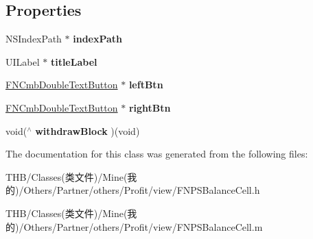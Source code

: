 \subsection*{Properties}
\begin{DoxyCompactItemize}
\item 
\mbox{\label{interface_f_n_p_s_balance_cell_aff16682d0b59c8b62ca5bdc0540b9d07}} 
N\+S\+Index\+Path $\ast$ {\bfseries index\+Path}
\item 
\mbox{\label{interface_f_n_p_s_balance_cell_a66fd8d122f8c8933abf21c413a8a4d15}} 
U\+I\+Label $\ast$ {\bfseries title\+Label}
\item 
\mbox{\label{interface_f_n_p_s_balance_cell_a8379cce48b2a13bce59699a388270b5a}} 
\mbox{\hyperlink{interface_f_n_cmb_double_text_button}{F\+N\+Cmb\+Double\+Text\+Button}} $\ast$ {\bfseries left\+Btn}
\item 
\mbox{\label{interface_f_n_p_s_balance_cell_aa3c617345c7d7021910b76327d4da4b9}} 
\mbox{\hyperlink{interface_f_n_cmb_double_text_button}{F\+N\+Cmb\+Double\+Text\+Button}} $\ast$ {\bfseries right\+Btn}
\item 
\mbox{\label{interface_f_n_p_s_balance_cell_a80e147052a040670a5e25e679459527d}} 
void($^\wedge$ {\bfseries withdraw\+Block} )(void)
\end{DoxyCompactItemize}


The documentation for this class was generated from the following files\+:\begin{DoxyCompactItemize}
\item 
T\+H\+B/\+Classes(类文件)/\+Mine(我的)/\+Others/\+Partner/others/\+Profit/view/F\+N\+P\+S\+Balance\+Cell.\+h\item 
T\+H\+B/\+Classes(类文件)/\+Mine(我的)/\+Others/\+Partner/others/\+Profit/view/F\+N\+P\+S\+Balance\+Cell.\+m\end{DoxyCompactItemize}
